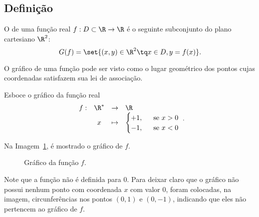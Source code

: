 \subsection{Definição}

\begin{definition}
    O  de uma função real $f : D \subset \R \to \R$ é o seguinte subconjunto do plano
cartesiano $\R^2$: $$G(f) = \set{(x,y) \in \R^2 \tq x \in D , y =
f(x)}.$$
\end{definition}

\begin{remark}
    O gráfico de uma função pode ser visto como o lugar geométrico
dos pontos cujas coordenadas satisfazem sua lei de associação.
\end{remark}

\begin{example}
    Esboce o gráfico da função real
    $$\begin{array}{cccl}
    f : & \R^\ast & \to     & \R \\
        &  x & \mapsto & \begin{cases}
                            +1,  &  \ \text{ se } x >0 \\
                            -1, &  \ \text{ se } x <0
                            \end{cases}
    \end{array}.$$
\end{example}

\begin{solution}
    Na Imagem~\ref{img:grafico-funcao-zeroum}, é mostrado o gráfico de $f$.

    \begin{figure}[ht]
    \centering
    \caption{Gráfico da função $f$.}
    \label{img:grafico-funcao-zeroum}
    \end{figure}

    Note que a função não é definida para 0.
    Para deixar claro que o gráfico não possui nenhum ponto com coordenada $x$ com valor $0$, foram colocadas, na imagem, circunferências nos pontos $(0,1)$ e $(0,-1)$, indicando que eles não pertencem ao gráfico de $f$.
\end{solution}